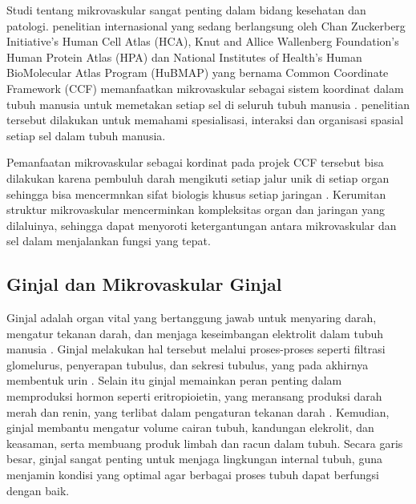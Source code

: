 \noindent Studi tentang mikrovaskular sangat penting dalam bidang kesehatan dan patologi. penelitian internasional yang sedang berlangsung oleh Chan Zuckerberg Initiative's Human Cell Atlas (HCA), Knut and Allice Wallenberg Foundation's Human Protein Atlas (HPA) dan National Institutes of Health's Human BioMolecular Atlas Program (HuBMAP) yang bernama Common Coordinate Framework (CCF) memanfaatkan mikrovaskular sebagai sistem koordinat dalam tubuh manusia untuk memetakan setiap sel di seluruh tubuh manusia \cite{weber_considerations_2020}. penelitian tersebut dilakukan untuk memahami spesialisasi, interaksi dan organisasi spasial setiap sel dalam tubuh manusia.

\noindent Pemanfaatan mikrovaskular sebagai kordinat pada projek CCF tersebut bisa dilakukan karena pembuluh darah  mengikuti setiap jalur unik di setiap organ sehingga bisa mencermnkan sifat biologis khusus setiap jaringan \cite{weber_considerations_2020}. Kerumitan struktur mikrovaskular mencerminkan kompleksitas organ dan jaringan yang dilaluinya, sehingga dapat menyoroti ketergantungan antara mikrovaskular dan sel dalam menjalankan fungsi yang tepat. 



\subsection{Ginjal dan Mikrovaskular Ginjal}


\noindent Ginjal adalah organ vital yang bertanggung jawab untuk menyaring darah, mengatur tekanan darah, dan menjaga keseimbangan elektrolit dalam tubuh manusia \cite{sultan_microvasculature_2023,ito_s-27-1_2023,bagarao_renal_2023}. %
 Ginjal melakukan hal tersebut melalui proses-proses seperti filtrasi glomelurus, penyerapan tubulus, dan sekresi tubulus, yang pada akhirnya membentuk urin \cite{auctores_publishing_llc_what_2021}. Selain itu ginjal memainkan peran penting dalam memproduksi hormon seperti eritropioietin, yang meransang produksi darah merah dan renin, yang terlibat dalam pengaturan tekanan darah \cite{scannali_s-22-6_2023}. Kemudian, ginjal membantu mengatur volume cairan tubuh, kandungan elekrolit, dan keasaman, serta membuang produk limbah dan racun dalam tubuh. Secara garis besar, ginjal sangat penting untuk menjaga lingkungan internal tubuh, guna menjamin kondisi yang optimal agar berbagai proses tubuh dapat berfungsi dengan baik.
 

